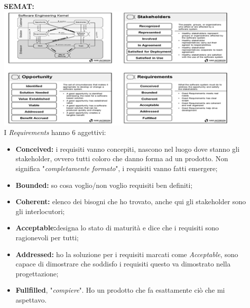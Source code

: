 \textbf{SEMAT:} \\
\includegraphics[width=0.5\columnwidth]{img6}\\
I \textit{Requirements} hanno 6 aggettivi:
\begin{itemize}
	\item \textbf{Conceived:} i requisiti vanno concepiti, nascono nel luogo dove stanno gli stakeholder, ovvero tutti coloro che danno forma ad un prodotto. Non significa "\textit{completamente formato}", i requisiti vanno fatti emergere;
	\item \textbf{Bounded:} so cosa voglio/non voglio requisiti ben definiti;
	\item \textbf{Coherent:} elenco dei bisogni che ho trovato, anche qui gli stakeholder sono gli interlocutori;
	\item \textbf{Acceptable:}designa lo stato di maturità e dice che i requisiti sono ragionevoli per tutti;
	\item \textbf{Addressed:} ho la soluzione per i requisiti marcati come \textit{Acceptable}, sono capace di dimostrare che soddisfo i requisiti questo va dimostrato nella progettazione;
	\item \textbf{Fullfilled}, "\textit{compiere}". Ho un prodotto che fa esattamente ciò che mi aspettavo.	\end{itemize}
	
